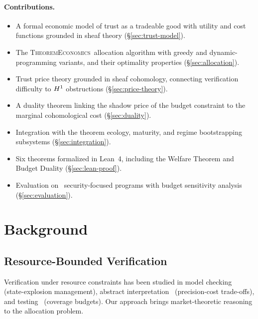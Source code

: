 \documentclass[11pt]{article}
\newcommand{\TheoremEcon}{\textsc{TheoremEconomics}}
\begin{document}
\paragraph{Contributions.}
\begin{itemize}[noitemsep]
  \item A formal economic model of trust as a tradeable good with
        utility and cost functions grounded in sheaf theory
        (§\ref{sec:trust-model}).
  \item The \TheoremEcon\ allocation algorithm with greedy and
        dynamic-programming variants, and their optimality
        properties (§\ref{sec:allocation}).
  \item Trust price theory grounded in sheaf cohomology, connecting
        verification difficulty to $H^{1}$ obstructions
        (§\ref{sec:price-theory}).
  \item A duality theorem linking the shadow price of the budget
        constraint to the marginal cohomological cost
        (§\ref{sec:duality}).
  \item Integration with the theorem ecology, maturity, and
        regime bootstrapping subsystems
        (§\ref{sec:integration}).
  \item Six theorems formalized in Lean~4, including the Welfare
        Theorem and Budget Duality (§\ref{sec:lean-proof}).
  \item Evaluation on \ppLVtotalPrograms\ security-focused programs
        with budget sensitivity analysis
        (§\ref{sec:evaluation}).
\end{itemize}

\section{Background}\label{sec:background}

\subsection{Resource-Bounded Verification}
Verification under resource constraints has been studied in
model checking~\cite{Clarke2018} (state-explosion management),
abstract interpretation~\cite{Cousot1977} (precision-cost trade-offs),
and testing~\cite{Godefroid2005} (coverage budgets).  Our approach
brings market-theoretic reasoning to the allocation problem.
\end{document}
